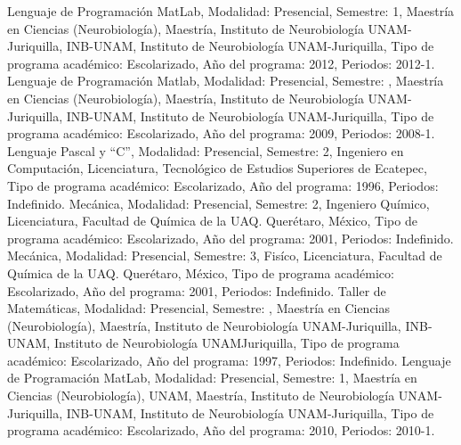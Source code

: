 Lenguaje de Programación MatLab, Modalidad: Presencial, Semestre: 1, Maestría en Ciencias (Neurobiología), Maestría, Instituto de Neurobiología UNAM-Juriquilla, INB-UNAM, Instituto de Neurobiología UNAM-Juriquilla, Tipo de programa académico: Escolarizado, Año del programa: 2012, Periodos: 2012-1.
Lenguaje de Programación Matlab, Modalidad: Presencial, Semestre: , Maestría en Ciencias (Neurobiología), Maestría, Instituto de Neurobiología UNAM-Juriquilla, INB-UNAM, Instituto de Neurobiología UNAM-Juriquilla, Tipo de programa académico: Escolarizado, Año del programa: 2009, Periodos: 2008-1.
Lenguaje Pascal y “C”, Modalidad: Presencial, Semestre: 2, Ingeniero en Computación, Licenciatura, Tecnológico de Estudios Superiores de Ecatepec, Tipo de programa académico: Escolarizado, Año del programa: 1996, Periodos: Indefinido.
Mecánica, Modalidad: Presencial, Semestre: 2, Ingeniero Químico, Licenciatura, Facultad de Química de la UAQ. Querétaro, México, Tipo de programa académico: Escolarizado, Año del programa: 2001, Periodos: Indefinido.
Mecánica, Modalidad: Presencial, Semestre: 3, Fisíco, Licenciatura, Facultad de Química de la UAQ. Querétaro, México, Tipo de programa académico: Escolarizado, Año del programa: 2001, Periodos: Indefinido.
Taller de Matemáticas, Modalidad: Presencial, Semestre: , Maestría en Ciencias (Neurobiología), Maestría, Instituto de Neurobiología UNAM-Juriquilla, INB-UNAM, Instituto de Neurobiología UNAMJuriquilla, Tipo de programa académico: Escolarizado, Año del programa: 1997, Periodos: Indefinido.
Lenguaje de Programación MatLab, Modalidad: Presencial, Semestre: 1, Maestría en Ciencias (Neurobiología), UNAM, Maestría, Instituto de Neurobiología UNAM-Juriquilla, INB-UNAM, Instituto de Neurobiología UNAM-Juriquilla, Tipo de programa académico: Escolarizado, Año del programa: 2010, Periodos: 2010-1.

